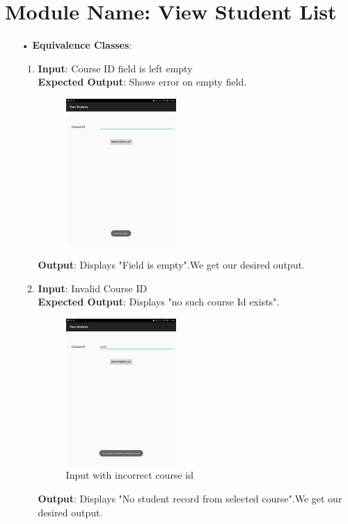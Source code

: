 \documentclass{scrreprt}
\begin{document}
\section{Module Name: View Student List}
\begin{itemize}
\item[•]\textbf{Equivalence Classes}:
\begin{enumerate}
\item \textbf{Input}: Course ID field is left empty\\
\textbf{Expected Output}: Shows error on empty field.
\begin{figure}[H]
\centering
\includegraphics[width=0.42\textwidth, keepaspectratio]{viewempty.jpg}
\end{figure}
\textbf{Output}: Displays "Field is empty".We get our desired output.

\item \textbf{Input}: Invalid Course ID\\
\textbf{Expected Output}: Displays "no such course Id exists".
\begin{figure}[H]
\centering
\includegraphics[width=0.42\textwidth, keepaspectratio]{viewnot.jpg}
\caption{Input with incorrect course id}
\end{figure}
\textbf{Output}: Displays "No student record from selected course".We get our desired output.


\end{enumerate}
\end{itemize}
\end{document}
